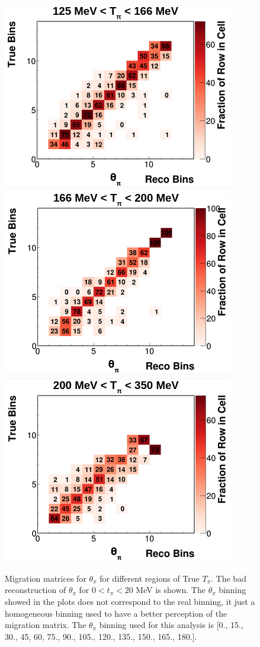 \begin{figure}[!htb]
    \includegraphics[scale=0.33]{Figures/Chapter4/SignalDefinition/thetapi125to166tpi.png}
    \includegraphics[scale=0.33]{Figures/Chapter4/SignalDefinition/thetapi166to200tpi.png}
    \includegraphics[scale=0.33]{Figures/Chapter4/SignalDefinition/thetapi200to350tpi.png}
    \caption{Migration matrices for $\theta_\pi$ for different regions of True $T_\pi$. The bad reconstruction of $\theta_\pi$ for $0<t_\pi<20$ MeV is shown. The $\theta_\pi$ binning showed in the plots does not correspond to the real binning, it just a homogeneous binning used to have a better perception of the migration matrix. The $\theta_\pi$ binning used for this analysis is [0., 15., 30., 45, 60, 75., 90., 105., 120., 135., 150., 165., 180.].}
    \label{fig:Analysis:SignalDefinition:1DAnalysis:thetapivsTpi}
\end{figure}


